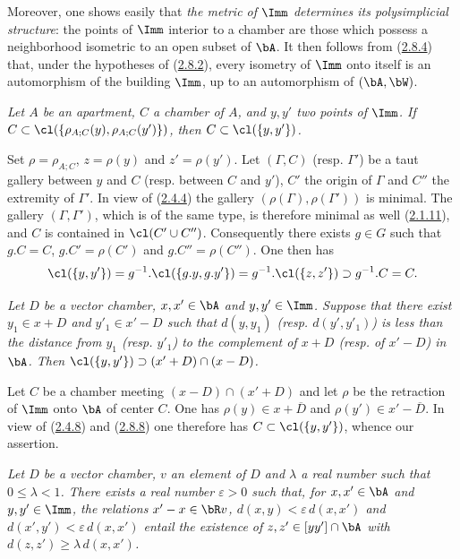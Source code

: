 \documentclass[12pt,a4paper,oneside,english]{smfart}
\makeatletter
\newcommand{\btanchor}[1]{\leavevmode\Hy@raisedlink{\hypertarget{bt:#1}{}}}
\newcommand{\btpageanchor}[1]{\Hy@raisedlink{\hypertarget{p:#1}{}}}
\newcommand{\btref}[1]{\hyperlink{bt:#1}{#1}}
\newcommand{\btpage}[1]{\marginnote{p.~#1}\btpageanchor{#1}}
\newcommand{\pagemark}[1]{\btpage{#1}}
\theoremstyle{definition}
\theoremstyle{bt}
\makeatother
\begin{document}
Moreover, one shows easily that \emph{the metric of $\Imm$ determines its
polysimplicial structure}: the points of $\Imm$ interior to a chamber are
those which possess a neighborhood isometric to an open subset of $\bA$. It
then follows from (\btref{2.8.4}) that, under the hypotheses of (\btref{2.8.2}), every
isometry of $\Imm$ onto itself is an automorphism of the building $\Imm$, up
to an automorphism of $(\bA,\bW)$.

\btanchor{2.8.8}
\emph{Let $A$ be an apartment, $C$ a chamber of $A$, and $y,y'$ two points of
$\Imm$. If $C\subset\cl(\{\rho_{A;C}(y),\rho_{A;C}(y')\})$, then
$C\subset\cl(\{y,y'\})$.}

\medskip
Set $\rho=\rho_{A;C}$, $z=\rho(y)$ and $z'=\rho(y')$. Let $(\Gamma,C)$ (resp.
$\Gamma'$) be a taut gallery between $y$ and $C$ (resp. between $C$ and
$y'$), $C'$ the origin of $\Gamma$ and $C''$ the extremity of $\Gamma'$. In
view of (\btref{2.4.4}) the gallery $(\rho(\Gamma),\rho(\Gamma'))$ is minimal. The
gallery $(\Gamma,\Gamma')$, which is of the same type, is therefore minimal as
well (\btref{2.1.11}), and $C$ is contained in $\cl(C'\cup C'')$. Consequently there
exists $g\in G$ such that $g.C=C$, $g.C'=\rho(C')$ and $g.C''=\rho(C'')$. One
then has
\[
\cl(\{y,y'\})=g^{-1}.\cl(\{g.y,g.y'\})=g^{-1}.\cl(\{z,z'\})\supset g^{-1}.C=C.
\]

\btanchor{2.8.9}
\emph{Let $D$ be a vector chamber, $x,x'\in\bA$ and $y,y'\in\Imm$. Suppose
that there exist $y_1\in x+D$ and $y'_1\in x'-D$ such that $d(y,y_1)$ (resp.
$d(y',y'_1)$) is less than the distance from $y_1$ (resp. $y'_1$) to the
complement of $x+D$ (resp. of $x'-D$) in $\bA$. Then
$\cl(\{y,y'\})\supset (x'+D)\cap(x-D)$.}

\medskip
\pagemark{56}
Let $C$ be a chamber meeting $(x-D)\cap(x'+D)$ and let $\rho$ be the
retraction of $\Imm$ onto $\bA$ of center $C$. One has
$\rho(y)\in x+\overline{D}$ and $\rho(y')\in x'-\overline{D}$. In view of
(\btref{2.4.8}) and (\btref{2.8.8}) one therefore has $C\subset\cl(\{y,y'\})$, whence our
assertion.

\btanchor{2.8.10}
\emph{Let $D$ be a vector chamber, $v$ an element of $D$ and $\lambda$ a real
number such that $0\le\lambda<1$. There exists a real number $\varepsilon>0$
such that, for $x,x'\in\bA$ and $y,y'\in\Imm$, the relations $x'-x\in\bR v$,
$d(x,y)<\varepsilon\, d(x,x')$ and $d(x',y')<\varepsilon\, d(x,x')$ entail the
existence of $z,z'\in[yy']\cap\bA$ with $d(z,z')\ge\lambda\, d(x,x')$.}
\end{document}
